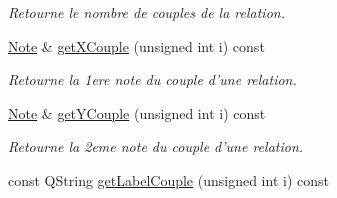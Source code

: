\begin{DoxyCompactItemize}
\begin{DoxyCompactList}\small\item\em Retourne le nombre de couples de la relation. \end{DoxyCompactList}\item 
\hyperlink{class_note}{Note} \& \hyperlink{class_relation_a607d485c7ebd115fb6cfac335a4ecd9d}{get\-X\-Couple} (unsigned int i) const 
\begin{DoxyCompactList}\small\item\em Retourne la 1ere note du couple d'une relation. \end{DoxyCompactList}\item 
\hyperlink{class_note}{Note} \& \hyperlink{class_relation_abadc8225cfeb86310a58bec83ba2d9d0}{get\-Y\-Couple} (unsigned int i) const 
\begin{DoxyCompactList}\small\item\em Retourne la 2eme note du couple d'une relation. \end{DoxyCompactList}\item 
\hypertarget{class_relation_a94c62232f1bbd097dd8e722accd80032}{const Q\-String \hyperlink{class_relation_a94c62232f1bbd097dd8e722accd80032}{get\-Label\-Couple} (unsigned int i) const }\label{class_relation_a94c62232f1bbd097dd8e722accd80032}


\end{DoxyCompactItemize}
